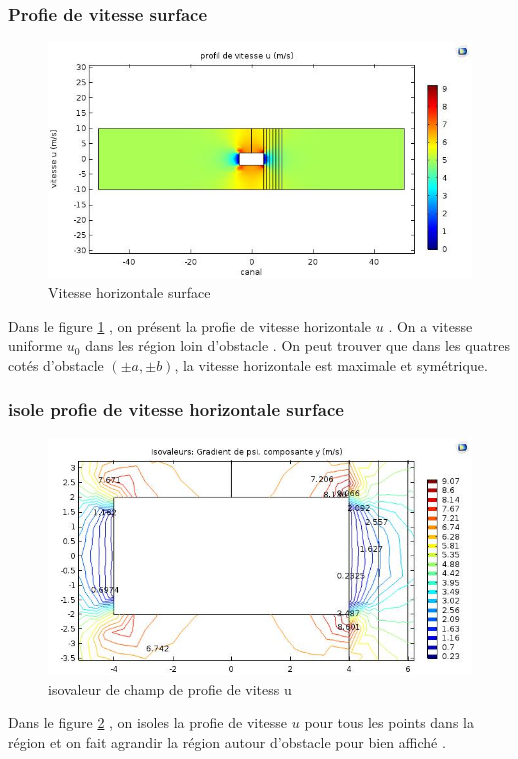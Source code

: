 \documentclass[a4paper,11pt]{report} %
\begin{document}
\subsubsection{Profie de vitesse surface}
\begin{figure}[!h]
\centering
\hspace*{0mm}\vfill
\begin{center} \includegraphics[width=1.\textwidth]{u_surface.jpg} \end{center}
\vfill\hspace*{0mm}
\caption{Vitesse horizontale surface}
\label{vitesse_u}
\end{figure}\pagebreak
Dans le figure \ref{vitesse_u} , on présent la profie de vitesse horizontale $u$ . On a vitesse uniforme $u_0$ dans les région loin d'obstacle . On peut trouver que dans les quatres cotés d'obstacle $(\pm a,\pm b)$, la vitesse horizontale est maximale et symétrique.  


\subsubsection{isole profie de vitesse horizontale surface}
\begin{figure}[!h]
\centering
\hspace*{0mm}\vfill
\begin{center} \includegraphics[width=1.\textwidth]{iso_u_surface.jpg} \end{center}
\vfill\hspace*{0mm}
\caption{isovaleur de champ de profie de vitess u}
\label{vitesse_u_iso}
\end{figure}\pagebreak
Dans le figure \ref{vitesse_u_iso} , on isoles la profie de vitesse $u$ pour tous les points dans la région et on fait agrandir la région autour d'obstacle pour bien affiché . 
\end{document}
